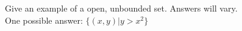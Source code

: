 {Give an example of a open, unbounded set.}
{Answers will vary.\\
One possible answer: $\{(x,y) | y> x^2 \}$}
